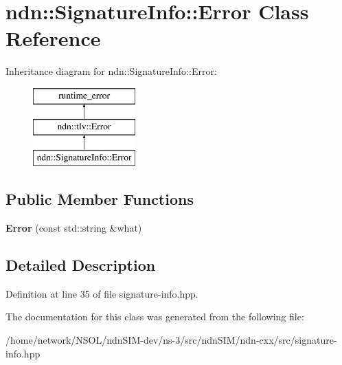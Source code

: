 \hypertarget{classndn_1_1SignatureInfo_1_1Error}{}\section{ndn\+:\+:Signature\+Info\+:\+:Error Class Reference}
\label{classndn_1_1SignatureInfo_1_1Error}
Inheritance diagram for ndn\+:\+:Signature\+Info\+:\+:Error\+:\begin{figure}[H]
\begin{center}
\leavevmode
\includegraphics[height=3.000000cm]{classndn_1_1SignatureInfo_1_1Error}
\end{center}
\end{figure}
\subsection*{Public Member Functions}
\begin{DoxyCompactItemize}
\item 
{\bfseries Error} (const std\+::string \&what)\hypertarget{classndn_1_1SignatureInfo_1_1Error_a4978e195a7bbd4315e18b191bb0ac71e}{}\label{classndn_1_1SignatureInfo_1_1Error_a4978e195a7bbd4315e18b191bb0ac71e}

\end{DoxyCompactItemize}


\subsection{Detailed Description}


Definition at line 35 of file signature-\/info.\+hpp.



The documentation for this class was generated from the following file\+:\begin{DoxyCompactItemize}
\item 
/home/network/\+N\+S\+O\+L/ndn\+S\+I\+M-\/dev/ns-\/3/src/ndn\+S\+I\+M/ndn-\/cxx/src/signature-\/info.\+hpp\end{DoxyCompactItemize}
